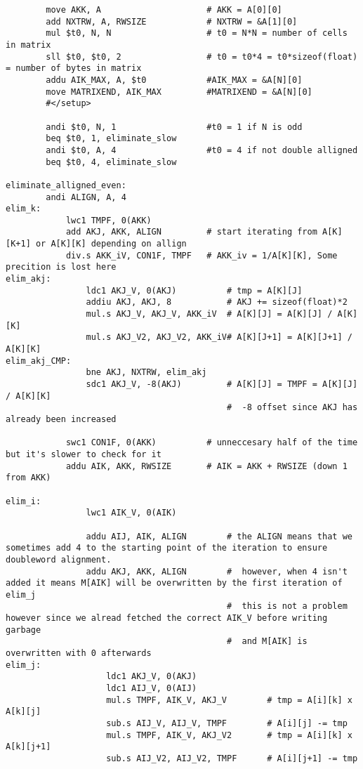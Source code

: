 \begin{verbatim}
        move AKK, A                     # AKK = A[0][0]
        add NXTRW, A, RWSIZE            # NXTRW = &A[1][0]
        mul $t0, N, N                   # t0 = N*N = number of cells in matrix
        sll $t0, $t0, 2                 # t0 = t0*4 = t0*sizeof(float) = number of bytes in matrix
        addu AIK_MAX, A, $t0            #AIK_MAX = &A[N][0] 
        move MATRIXEND, AIK_MAX         #MATRIXEND = &A[N][0]
        #</setup>
        
        andi $t0, N, 1                  #t0 = 1 if N is odd
        beq $t0, 1, eliminate_slow      
        andi $t0, A, 4                  #t0 = 4 if not double alligned
        beq $t0, 4, eliminate_slow

eliminate_alligned_even:
        andi ALIGN, A, 4
elim_k:         
            lwc1 TMPF, 0(AKK)
            add AKJ, AKK, ALIGN         # start iterating from A[K][K+1] or A[K][K] depending on allign
            div.s AKK_iV, CON1F, TMPF   # AKK_iv = 1/A[K][K], Some precition is lost here
elim_akj:
                ldc1 AKJ_V, 0(AKJ)          # tmp = A[K][J]
                addiu AKJ, AKJ, 8           # AKJ += sizeof(float)*2
                mul.s AKJ_V, AKJ_V, AKK_iV  # A[K][J] = A[K][J] / A[K][K]
                mul.s AKJ_V2, AKJ_V2, AKK_iV# A[K][J+1] = A[K][J+1] / A[K][K]
elim_akj_CMP:
                bne AKJ, NXTRW, elim_akj
                sdc1 AKJ_V, -8(AKJ)         # A[K][J] = TMPF = A[K][J] / A[K][K]
                                            #  -8 offset since AKJ has already been increased
                                            
            swc1 CON1F, 0(AKK)          # unneccesary half of the time but it's slower to check for it      
            addu AIK, AKK, RWSIZE       # AIK = AKK + RWSIZE (down 1 from AKK)  
            
elim_i:     
                lwc1 AIK_V, 0(AIK)
                
                addu AIJ, AIK, ALIGN        # the ALIGN means that we sometimes add 4 to the starting point of the iteration to ensure doubleword alignment.
                addu AKJ, AKK, ALIGN        #  however, when 4 isn't added it means M[AIK] will be overwritten by the first iteration of elim_j
                                            #  this is not a problem however since we alread fetched the correct AIK_V before writing garbage
                                            #  and M[AIK] is overwritten with 0 afterwards              
elim_j:     
                    ldc1 AKJ_V, 0(AKJ)  
                    ldc1 AIJ_V, 0(AIJ)              
                    mul.s TMPF, AIK_V, AKJ_V        # tmp = A[i][k] x A[k][j]
                    sub.s AIJ_V, AIJ_V, TMPF        # A[i][j] -= tmp
                    mul.s TMPF, AIK_V, AKJ_V2       # tmp = A[i][k] x A[k][j+1]
                    sub.s AIJ_V2, AIJ_V2, TMPF      # A[i][j+1] -= tmp
                    

\end{verbatim}
